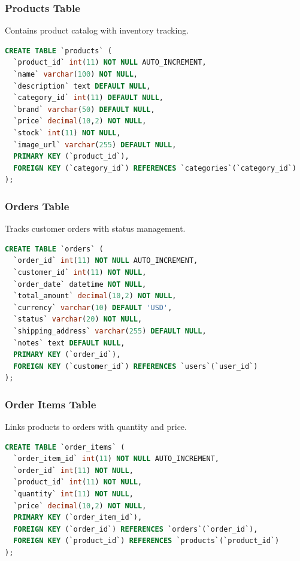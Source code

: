 \documentclass[12pt,a4paper]{article}
\begin{document}
\subsubsection{Products Table}
Contains product catalog with inventory tracking.

\begin{lstlisting}[language=SQL, caption=Products Table Schema]
CREATE TABLE `products` (
  `product_id` int(11) NOT NULL AUTO_INCREMENT,
  `name` varchar(100) NOT NULL,
  `description` text DEFAULT NULL,
  `category_id` int(11) DEFAULT NULL,
  `brand` varchar(50) DEFAULT NULL,
  `price` decimal(10,2) NOT NULL,
  `stock` int(11) NOT NULL,
  `image_url` varchar(255) DEFAULT NULL,
  PRIMARY KEY (`product_id`),
  FOREIGN KEY (`category_id`) REFERENCES `categories`(`category_id`)
);
\end{lstlisting}

\subsubsection{Orders Table}
Tracks customer orders with status management.

\begin{lstlisting}[language=SQL, caption=Orders Table Schema]
CREATE TABLE `orders` (
  `order_id` int(11) NOT NULL AUTO_INCREMENT,
  `customer_id` int(11) NOT NULL,
  `order_date` datetime NOT NULL,
  `total_amount` decimal(10,2) NOT NULL,
  `currency` varchar(10) DEFAULT 'USD',
  `status` varchar(20) NOT NULL,
  `shipping_address` varchar(255) DEFAULT NULL,
  `notes` text DEFAULT NULL,
  PRIMARY KEY (`order_id`),
  FOREIGN KEY (`customer_id`) REFERENCES `users`(`user_id`)
);
\end{lstlisting}

\subsubsection{Order Items Table}
Links products to orders with quantity and price.

\begin{lstlisting}[language=SQL, caption=Order Items Table Schema]
CREATE TABLE `order_items` (
  `order_item_id` int(11) NOT NULL AUTO_INCREMENT,
  `order_id` int(11) NOT NULL,
  `product_id` int(11) NOT NULL,
  `quantity` int(11) NOT NULL,
  `price` decimal(10,2) NOT NULL,
  PRIMARY KEY (`order_item_id`),
  FOREIGN KEY (`order_id`) REFERENCES `orders`(`order_id`),
  FOREIGN KEY (`product_id`) REFERENCES `products`(`product_id`)
);
\end{lstlisting}
\end{document}

